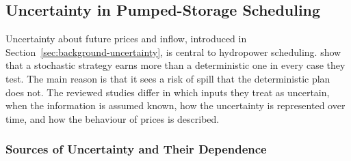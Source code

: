 
\subsection{Uncertainty in Pumped-Storage Scheduling}
\label{sec:lit_uncertainty}

Uncertainty about future prices and inflow, introduced in
Section~\ref{sec:background-uncertainty}, is central to hydropower
scheduling.
\citet{belsnes2016applying} show that a stochastic strategy earns more than
a deterministic one in every case they test. The main reason is that it sees
a risk of spill that the deterministic plan does not.
The reviewed studies differ in which inputs they treat as uncertain, when
the information is assumed known, how the uncertainty is represented over
time, and how the behaviour of prices is described.

\subsubsection{Sources of Uncertainty and Their Dependence}
\label{sec:lit_unc_sources}


